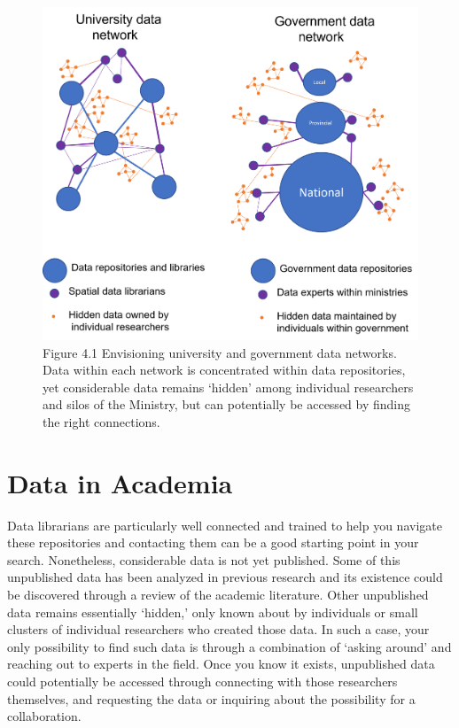 \documentclass[
]{book}
\begin{document}
\begin{figure}
\centering
\includegraphics{images/04-data-network-model.png}
\caption{Figure 4.1 Envisioning university and government data networks. Data within each network is concentrated within data repositories, yet considerable data remains `hidden' among individual researchers and silos of the Ministry, but can potentially be accessed by finding the right connections.}
\end{figure}

\hypertarget{data-in-academia}{%
\section{Data in Academia}\label{data-in-academia}}

Data librarians are particularly well connected and trained to help you navigate these repositories and contacting them can be a good starting point in your search. Nonetheless, considerable data is not yet published. Some of this unpublished data has been analyzed in previous research and its existence could be discovered through a review of the academic literature. Other unpublished data remains essentially `hidden,' only known about by individuals or small clusters of individual researchers who created those data. In such a case, your only possibility to find such data is through a combination of `asking around' and reaching out to experts in the field. Once you know it exists, unpublished data could potentially be accessed through connecting with those researchers themselves, and requesting the data or inquiring about the possibility for a collaboration.
\end{document}
